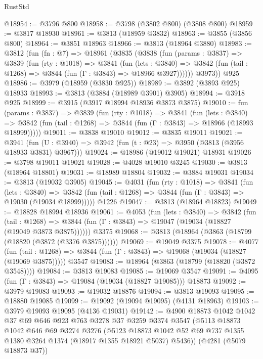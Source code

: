 \begin{lexlean}{RustStd}
\begin{coremodule}
{\begin{coremodule}
{{{{{{{{{{{{{{{{{{{{{{{{{{{{{{{{{{{@18954 := @3796 @800
@18958 := @3798 (@3802 @800) (@3808 @800)
@18959 := @3817 @18930
@18961 := @3813 (@18959 @3832)
@18963 := @3855 (@3856 @800)
@18964 := @3851 @18963
@18966 := @3813 (@18964 @3880)
@18983 := @3812
    (fun (fn : @7) =>
    @18961
      (@3835
        (@3838
          (fun (params : @3837) =>
          @3839
            (fun (rty : @1018) =>
            @3841
              (fun (lets : @3840) =>
              @3842 (fun (tail : @1268) => @3844 (fun (Γ : @3843) => @18966 @3927))))))
        @3973))
    @925
@18986 := @3979 (@18959 (@3830 @925))
@18989 := @3892 (@3893 @925) @18933
@18993 := @3813 (@3884 (@18989 @3901) @3905)
@18994 := @3918 @925
@18999 := @3915 (@3917 @18994 @18936 @3873 @3875)
@19010 := fun (params : @3837) =>
  @3839
    (fun (rty : @1018) =>
    @3841
      (fun (lets : @3840) =>
      @3842 (fun (tail : @1268) => @3844 (fun (Γ : @3843) => @18966 (@18993 @18999)))))
@19011 := @3838 @19010
@19012 := @3835 @19011
@19021 := @3941
    (fun (U : @3940) => @3942 (fun (t : @23) => @3950 (@3813 (@3956 @18933 @3831) @3967)))
@19024 := @18986 (@19012 @19021) @18931
@19026 := @3798 @19011 @19021
@19028 := @4028 @19010 @3245
@19030 := @3813 (@18964 @18801)
@19031 := @18989 @18804
@19032 := @3884 @19031
@19034 := @3813 (@19032 @3905)
@19045 := @4031
    (fun (rty : @1018) =>
    @3841
      (fun (lets : @3840) =>
      @3842 (fun (tail : @1268) => @3844 (fun (Γ : @3843) => @19030 (@19034 @18999)))))
    @1226
@19047 := @3813 (@18964 @18823)
@19049 := @18828 @18994 @18936
@19061 := @4053
    (fun (lets : @3840) =>
    @3842
      (fun (tail : @1268) =>
      @3844 (fun (Γ : @3843) => @19047 (@19034 (@18827 (@19049 @3873 @3875))))))
    @3375
@19068 := @3813 (@18964 (@3863 (@18799 (@18820 (@3872 (@3376 @3875))))))
@19069 := @19049 @3375
@19078 := @4077
    (fun (tail : @1268) => @3844 (fun (Γ : @3843) => @19068 (@19034 (@18827 (@19069 @3875)))))
    @3547
@19083 := @18964 (@3863 (@18799 (@18820 (@3872 @3548))))
@19084 := @3813 @19083
@19085 := @19069 @3547
@19091 := @4095 (fun (Γ : @3843) => @19084 (@19034 (@18827 @19085))) @18873
@19092 := @3979 @19083
@19093 := @19032 @18876
@19094 := @3813 @19093
@19095 := @18880 @19085
@19099 := @19092 (@19094 @19095) (@4131 @18963)
@19103 := @3979 @19093 @19095 (@4136 @19031)
@19142 := @4900
    @18873
    @1042
    @1042
    @37
    @69
    @646
    @923
    @763
    @3278
    @37
    @3259
    @3374
    @3547
    (@5113
      @18873
      @1042
      @646
      @69
      @3274
      @3276
      (@5123 @18873 @1042 @52 @69 @737 @1355 @1380 @3264 @1374 (@18917 @1355 @18921 @5037) @5436))
    (@4281 (@5079 @18873 @37))
}}}}}}}}}}}}}}}}}}}}}}}}}}}}}}}}}}}
\end{coremodule}}
\end{coremodule}
\end{lexlean}
